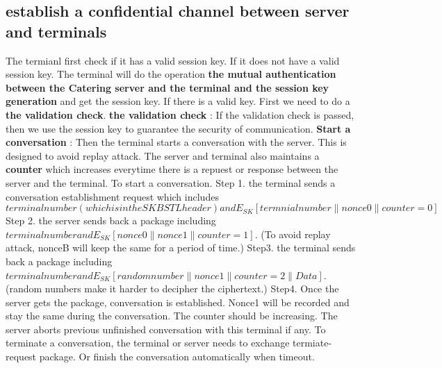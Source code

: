 \documentclass{article}
\begin{document}
        \subsection*{establish a confidential channel between server and terminals}
The termianl first check if it has a valid session key. 
If it does not have a valid session key. 
The terminal will do the operation \textbf{the mutual authentication between the Catering server and the terminal and the session key generation} and get the session key.
If there is a valid key. First we need to do a \textbf{the validation check}. 
\textbf{the validation check} :
If the validation check is passed, then we use the session key to guarantee the security of communication. 
        \newline
\textbf{Start a conversation} :
Then the terminal starts a conversation with the server. 
This is designed to avoid replay attack.
The server and terminal also maintains a \textbf{counter} which increases everytime there is a repuest or response between the server and the terminal.
To start a conversation.
        \newline
Step 1. the terminal sends a conversation establishment request which includes $terminal number (which is in the SKBSTL header) and E_{SK}[termnial number \parallel nonce0 \parallel counter = 0]$
        \newline 
Step 2. the server sends back a package including $terminal number and E_{SK}[nonce0 \parallel nonce1 \parallel counter = 1]$. 
(To avoid replay attack, nonceB will keep the same for a period of time.)
        \newline
Step3. the terminal sends back a package including $terminal number and E_{SK}[random number \parallel nonce1 \parallel counter = 2 \parallel Data]$. 
(random numbers make it harder to decipher the ciphertext.)
        \newline
Step4. Once the server gets the package, conversation is established. 
Nonce1 will be recorded and stay the same during the conversation.
The counter should be increasing. 
The server aborts previous unfinished conversation with this terminal if any.
        \newline
To terminate a conversation, the terminal or server needs to exchange termiate-request package. Or finish the conversation automatically when timeout.
\end{document}
